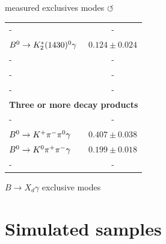 \documentclass[xcolor=dvipsnames]{beamer}
\begin{document}
\begin{frame}{\BtoXsdgamma measured exclusives modes \hyperlink{frame:A}{$\circlearrowleft$}}
\begin{minipage}[c]{0.395\textwidth}
{\begin{tabular}{|lc|}
          - & -\\
          $B^0 \rightarrow K_2^*(1430)^0 \gamma$ & $0.124 \pm 0.024$ \\ 
          - & -\\
          - & -\\
          - & -\\
          \hline
          \multicolumn{2}{|c|}{\textbf{Three or more decay products}}\\
          - & -\\
          $B^0 \rightarrow K^+ \pi^-\pi^0 \gamma$ & $0.407 \pm 0.038$\\
          $B^0 \rightarrow K^0 \pi^+\pi^- \gamma$ & $0.199 \pm 0.018$\\
          - & -\\
          \hline
      \end{tabular}
      }
  \end{minipage}
  
  \vspace{10pt}
  
  \begin{minipage}[c]{0.395\textwidth}
      \centering
      $B\to X_d\gamma$ exclusive modes
  \end{minipage}
  

\end{frame}

\section{Simulated samples}
\end{document}
